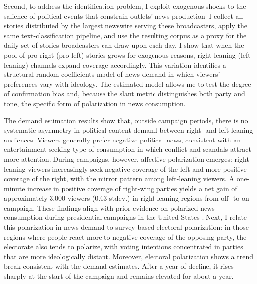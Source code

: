 \documentclass[12pt]{article}
\begin{document}


Second, to address the identification problem, I exploit exogenous shocks to the salience of political events that constrain outlets’ news production. I collect all stories distributed by the largest newswire serving these broadcasters, apply the same text-classification pipeline, and use the resulting corpus as a proxy for the daily  set of stories broadcasters can draw upon each day. I show that  when the pool of pro-right (pro-left) stories grows for exogenous reasons, right-leaning (left-leaning) channels expand  coverage accordingly. This variation identifies a structural random-coefficients model of news demand in which viewers’ preferences vary with ideology. The estimated model  allows me to test the degree of confirmation bias and, because the slant metric distinguishes both party and tone, the specific form of polarization in news consumption.


The demand estimation results show that, outside campaign periods, there is no systematic asymmetry in political-content demand between right- and left-leaning audiences. Viewers generally prefer negative political news, consistent with an entertainment-seeking type of consumption in which conflict and scandals attract more attention. During campaigns, however, affective polarization emerges: right-leaning viewers increasingly seek negative coverage of the left and more positive coverage of the right, with the mirror pattern among left-leaning viewers. A one-minute increase in positive coverage of right-wing parties yields a net gain of approximately 3,000 viewers (0.03 stdev.)  in right-leaning regions  from off- to on-campaign. These findings align with prior evidence on polarized news consumption during presidential campaigns in the United States \citep{Peterson2017Echo}. Next, I relate this polarization in news demand to survey-based electoral polarization: in those regions where people react more to negative coverage of the opposing party, the electorate also tends to polarize, with voting  intentions  concentrated in parties that are more ideologically distant. Moreover, electoral polarization shows a trend break consistent with the demand estimates. After a year of decline, it rises sharply at the start of the campaign and remains elevated for about a year.
\end{document}
